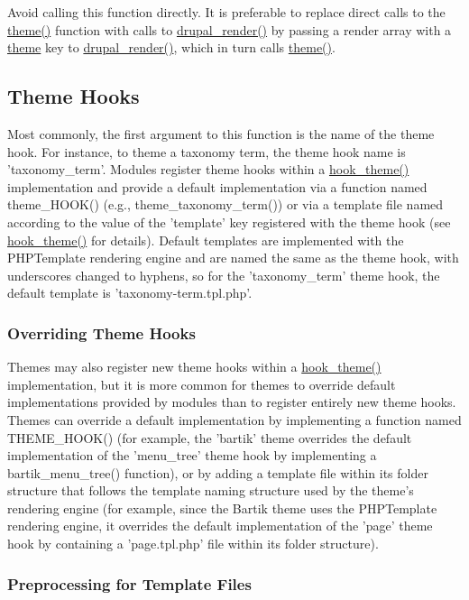 Avoid calling this function directly. It is preferable to replace direct calls to the \hyperlink{includes_2theme_8inc_a7c25609a935874541a19657affd30fff}{theme()} function with calls to \hyperlink{common_8inc_a05798b44e8d6c496d4bee5cc32fa7851}{drupal\_\-render()} by passing a render array with a \hyperlink{includes_2theme_8inc_a7c25609a935874541a19657affd30fff}{theme} key to \hyperlink{common_8inc_a05798b44e8d6c496d4bee5cc32fa7851}{drupal\_\-render()}, which in turn calls \hyperlink{includes_2theme_8inc_a7c25609a935874541a19657affd30fff}{theme()}.\hypertarget{includes_2theme_8inc_sec_theme_hooks}{}\subsection{Theme Hooks}\label{includes_2theme_8inc_sec_theme_hooks}
Most commonly, the first argument to this function is the name of the theme hook. For instance, to theme a taxonomy term, the theme hook name is 'taxonomy\_\-term'. Modules register theme hooks within a \hyperlink{group__hooks_ga013ccb45c7aaab1c16cf9691428c910d}{hook\_\-theme()} implementation and provide a default implementation via a function named theme\_\-HOOK() (e.g., theme\_\-taxonomy\_\-term()) or via a template file named according to the value of the 'template' key registered with the theme hook (see \hyperlink{group__hooks_ga013ccb45c7aaab1c16cf9691428c910d}{hook\_\-theme()} for details). Default templates are implemented with the PHPTemplate rendering engine and are named the same as the theme hook, with underscores changed to hyphens, so for the 'taxonomy\_\-term' theme hook, the default template is 'taxonomy-\/term.tpl.php'.\hypertarget{includes_2theme_8inc_sub_overriding_theme_hooks}{}\subsubsection{Overriding Theme Hooks}\label{includes_2theme_8inc_sub_overriding_theme_hooks}
Themes may also register new theme hooks within a \hyperlink{group__hooks_ga013ccb45c7aaab1c16cf9691428c910d}{hook\_\-theme()} implementation, but it is more common for themes to override default implementations provided by modules than to register entirely new theme hooks. Themes can override a default implementation by implementing a function named THEME\_\-HOOK() (for example, the 'bartik' theme overrides the default implementation of the 'menu\_\-tree' theme hook by implementing a bartik\_\-menu\_\-tree() function), or by adding a template file within its folder structure that follows the template naming structure used by the theme's rendering engine (for example, since the Bartik theme uses the PHPTemplate rendering engine, it overrides the default implementation of the 'page' theme hook by containing a 'page.tpl.php' file within its folder structure).\hypertarget{includes_2theme_8inc_sub_preprocess_templates}{}\subsubsection{Preprocessing for Template Files}\label{includes_2theme_8inc_sub_preprocess_templates}
